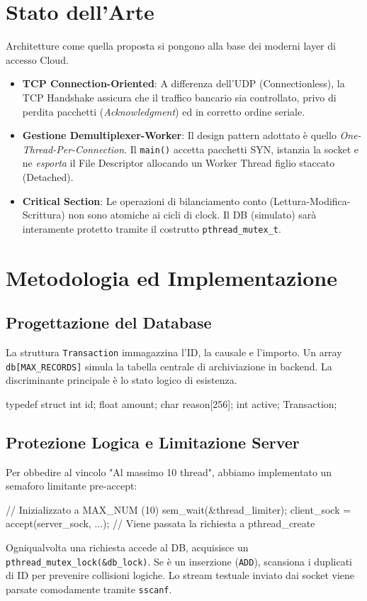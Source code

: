 \documentclass[a4paper,12pt]{article}
\begin{document}
\section{Stato dell'Arte}
Architetture come quella proposta si pongono alla base dei moderni layer di accesso Cloud.
\begin{itemize}
    \item \textbf{TCP Connection-Oriented}: A differenza dell'UDP (Connectionless), la TCP Handshake assicura che il traffico bancario sia controllato, privo di perdita pacchetti (\textit{Acknowledgment}) ed in corretto ordine seriale.
    \item \textbf{Gestione Demultiplexer-Worker}: Il design pattern adottato è quello \textit{One-Thread-Per-Connection}. Il \texttt{main()} accetta pacchetti SYN, istanzia la socket e ne \textit{esporta} il File Descriptor allocando un Worker Thread figlio staccato (Detached).
    \item \textbf{Critical Section}: Le operazioni di bilanciamento conto (Lettura-Modifica-Scrittura) non sono atomiche ai cicli di clock. Il DB (simulato) sarà interamente protetto tramite il costrutto \texttt{pthread\_mutex\_t}.
\end{itemize}

\section{Metodologia ed Implementazione}

\subsection{Progettazione del Database}
La struttura \texttt{Transaction} immagazzina l'ID, la causale e l'importo. Un array \texttt{db[MAX\_RECORDS]} simula la tabella centrale di archiviazione in backend. La discriminante principale è lo stato logico di esistenza.
\begin{ccode}
typedef struct {
    int id;
    float amount;
    char reason[256];
    int active;
} Transaction;
\end{ccode}

\subsection{Protezione Logica e Limitazione Server}
Per obbedire al vincolo "Al massimo 10 thread", abbiamo implementato un semaforo limitante pre-accept:
\begin{ccode}
// Inizializzato a MAX_NUM (10)
sem_wait(&thread_limiter); 
client_sock = accept(server_sock, ...);
// Viene passata la richiesta a pthread_create
\end{ccode}
Ogniqualvolta una richiesta accede al DB, acquisisce un \texttt{pthread\_mutex\_lock(\&db\_lock)}. Se è un inserzione (\texttt{ADD}), scansiona i duplicati di ID per prevenire collisioni logiche. Lo stream testuale inviato dai socket viene parsate comodamente tramite \texttt{sscanf}.
\end{document}
